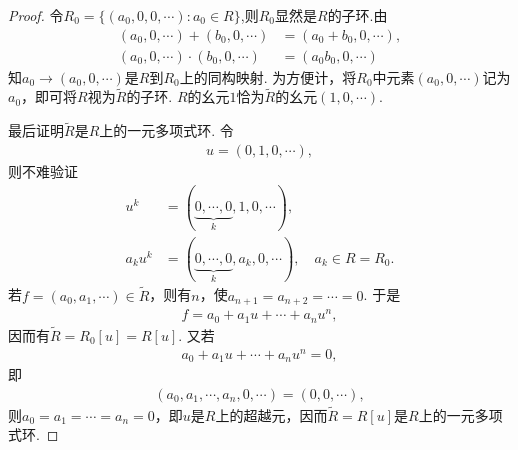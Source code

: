 \documentclass[../../main.tex]{subfiles}%
\begin{document}
\begin{proof}
令$R_0=\{(a_0,0,0,\cdots):a_0\in R\}$,则$R_0$显然是$R$的子环.由
\begin{align*}
(a_0,0,\cdots)+(b_0,0,\cdots)&=(a_0+b_0,0,\cdots),\\
(a_0,0,\cdots)\cdot(b_0,0,\cdots)&=(a_0b_0,0,\cdots)
\end{align*}
知$a_0\to(a_0,0,\cdots)$是$R$到$R_0$上的同构映射. 为方便计，将$R_0$中元素$(a_0,0,\cdots)$记为$a_0$，即可将$R$视为$\widetilde{R}$的子环. $R$的幺元$1$恰为$\widetilde{R}$的幺元$(1,0,\cdots)$.

最后证明$\widetilde{R}$是$R$上的一元多项式环. 令
\begin{align*}
u=(0,1,0,\cdots),
\end{align*}
则不难验证
\begin{align*}
u^k&=(\underbrace{0,\cdots,0}_{k},1,0,\cdots),\\
a_ku^k&=(\underbrace{0,\cdots,0}_{k},a_k,0,\cdots),\quad a_k\in R=R_0.
\end{align*}
若$f=(a_0,a_1,\cdots)\in\widetilde{R}$，则有$n$，使$a_{n+1}=a_{n+2}=\cdots=0$. 于是
\begin{align*}
f=a_0+a_1u+\cdots+a_nu^n,
\end{align*}
因而有$\widetilde{R}=R_0[u]=R[u]$. 又若
\begin{align*}
a_0+a_1u+\cdots+a_nu^n=0,
\end{align*}
即
\begin{align*}
(a_0,a_1,\cdots,a_n,0,\cdots)=(0,0,\cdots),
\end{align*}
则$a_0=a_1=\cdots=a_n=0$，即$u$是$R$上的超越元，因而$\widetilde{R}=R[u]$是$R$上的一元多项式环.

\end{proof}
\end{document}

